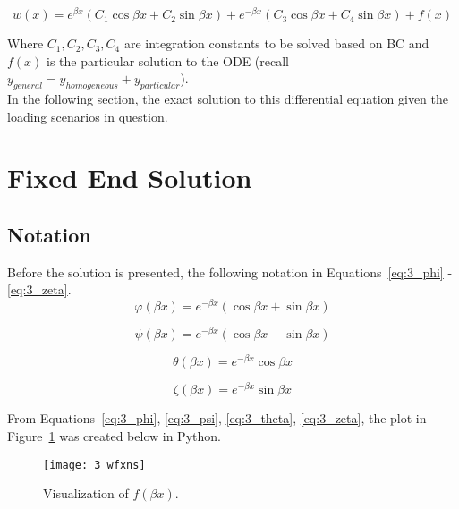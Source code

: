 \begin{equation}
	\label{eq:solnDE}
	w(x)=e^{\beta x} \left(C_1 \cos \beta x +C_2 \sin \beta x \right)+e^{-\beta x} \left(C_3 \cos \beta x +C_4 \sin \beta x \right) +f(x)
\end{equation}

Where $ C_1, C_2, C_3, C_4$ are integration constants to be solved based on BC and $f(x)$ is the particular solution to the ODE (recall $y_{general}=y_{homogeneous}+y_{particular}$).\\

In the following section, the exact solution to this differential equation given the loading scenarios in question.

\section{Fixed End Solution}

\subsection{Notation}

Before the solution is presented, the following notation in Equations~\ref{eq:3_phi} - \ref{eq:3_zeta}.
\begin{equation}
	\label{eq:3_phi}
	\varphi (\beta x) = e^{-\beta x} \left(\cos \beta x + \sin \beta x \right)
\end{equation}

\begin{equation}
	\label{eq:3_psi}
	\psi (\beta x) = e^{-\beta x} \left(\cos \beta x - \sin \beta x \right)
\end{equation}

\begin{equation}
	\label{eq:3_theta}
	\theta (\beta x) = e^{-\beta x} \cos \beta x
\end{equation}

\begin{equation}
	\label{eq:3_zeta}
	\zeta (\beta x) = e^{-\beta x} \sin \beta x
\end{equation}

From Equations~\ref{eq:3_phi}, \ref{eq:3_psi}, \ref{eq:3_theta}, \ref{eq:3_zeta}, the plot in Figure~\ref{fig:3_wfxsn} was created below in Python.
\begin{figure}[H]
	\centering
	\texttt{[image: 3\_wfxns]}
	\caption{Visualization of $f(\beta x)$.}
	\label{fig:3_wfxsn}
\end{figure}

